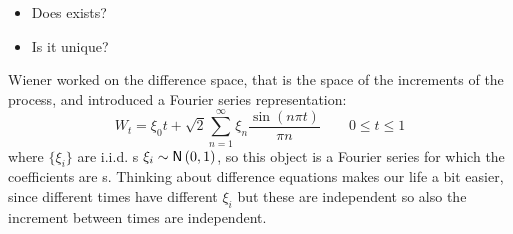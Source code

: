 \documentclass[12pt]{report}
\begin{document}
\begin{itemize}
	\item Does \bwm{} exists?
	\item Is it unique?
\end{itemize}
Wiener worked on the difference space, that is the space of the increments of the process, and introduced a Fourier series representation:
\begin{equation*}
	W_t=\xi_{0}t+\sqrt{2}\sum_{n=1}^{\infty}\xi_{n}\frac{\sin(n\pi t)}{\pi n}\qquad0\leq t\leq 1
\end{equation*}
where $\{\xi_{i}\}$ are i.i.d. \rv s $\xi_{i}\sim\mathsf{N}\left(0,1\right)$, so this object is a Fourier series for which the coefficients are \rv s. Thinking about difference equations makes our life a bit easier, since different times have different $\xi_{i}$ but these are independent so also the increment between times are independent.
\end{document}
